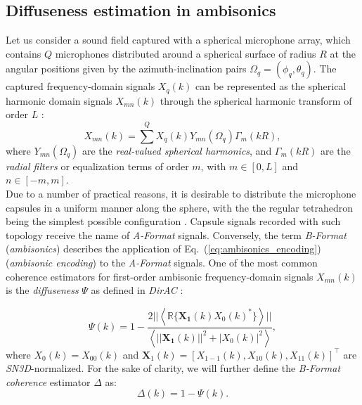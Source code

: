 \subsection{\label{subsec:3:2}Diffuseness estimation in ambisonics}
Let us consider a sound field captured with a spherical microphone array,
which contains $Q$ microphones distributed around a spherical surface of radius $R$
at the angular positions given by the azimuth-inclination pairs
$\Omega_q = (\phi_q,\theta_q)$.
The captured frequency-domain signals $ X_q(k)$ can be represented as the spherical harmonic domain signals $X_{mn}(k)$ through the spherical harmonic transform of order $L$ \cite{bertet_3d_2006}:
\begin{equation}
        X_{mn}(k) = \sum^{Q} X_q(k) Y_{mn}(\Omega_q) \Gamma_m(kR),
    \label{eq:ambisonics_encoding}
\end{equation}
where $Y_{mn}(\Omega_q)$ are the \textit{real-valued spherical harmonics}, and $\Gamma_m(kR)$ are the
\textit{radial filters} or equalization terms of order $m$, with $m \in [0,L]$ and $n \in [-m,m]$.\\


Due to a number of practical reasons, it is desirable to distribute the microphone capsules in a uniform manner along the sphere, with the the regular tetrahedron being the simplest possible configuration
 \cite{gerzon_design_1975}. Capsule signals recorded with such topology receive the name of \textit{A-Format} signals. Conversely, the term \textit{B-Format} (\textit{ambisonics}) describes the application of Eq.~(\ref{eq:ambisonics_encoding}) (\textit{ambisonic encoding}) to the \textit{A-Format} signals.
One of the most common coherence estimators for first-order ambisonic frequency-domain signals $X_{mn}(k)$ is the \textit{diffuseness} $\Psi$ as defined in \textit{DirAC} \cite{pulkki_directional_2006}:



\begin{equation}
    \Psi(k) = 1 - \frac{2 ||\left\langle \mathbb{R}\{\bm{X_1}(k)X_0(k)^* \} \right\rangle|| }{ \left\langle||\bm{X_1}(k)||^2 + |X_0(k)|^2\right\rangle},
    \label{eq:psi}
\end{equation}
where $X_0(k) = X_{00}(k)$ 
and $\bm{X}_1(k) = [X_{1-1}(k), X_{10}(k), X_{11}(k)]^\intercal$ are \textit{SN3D}-normalized.
For the sake of clarity, we will further define the \textit{B-Format coherence} estimator $\Delta$ as:
\begin{equation}
	\Delta(k) = 1 - \Psi(k).
	\label{eq:delta}
\end{equation}


